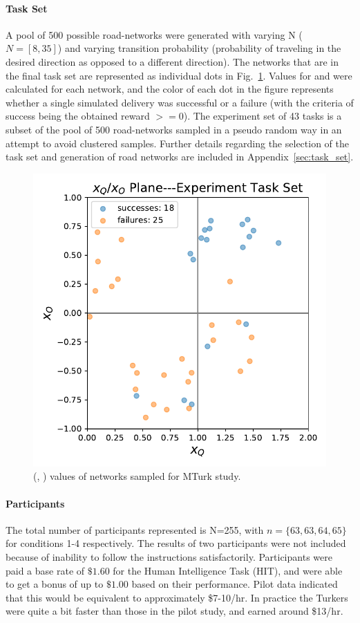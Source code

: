     \noindent \paragraph{Task Set}
    A pool of 500 possible road-networks were generated with varying N ($N=[8,35]$) and varying transition probability (probability of traveling in the desired direction as opposed to a different direction). The networks that are in the final task set are represented as individual dots in Fig.~\ref{fig:exp_set}. Values for \xQ{} and \xO{} were calculated for each network, and the color of each dot in the figure represents whether a single simulated delivery was successful or a failure (with the criteria of success being the obtained reward $ >= 0$). The experiment set of 43 tasks is a subset of the pool of 500 road-networks sampled in a pseudo random way in an attempt to avoid clustered samples. Further details regarding the selection of the task set and generation of road networks are included in Appendix~\ref{sec:task_set}.

    \begin{figure}[tbp]
        \centering
        \includegraphics[width=0.6\linewidth]{Figures/xQxO_plane_experiment_set.pdf}
        \caption{(\xQ{}, \xO{}) values of networks sampled for MTurk study.}
        \label{fig:exp_set}
    \end{figure}

    \noindent \paragraph{Participants}
    The total number of participants represented is N=255, with $n=\{63,63,64,65\}$ for conditions 1-4 respectively. The results of two participants were not included because of inability to follow the instructions satisfactorily. Participants were paid a base rate of $\$1.60$ for the Human Intelligence Task (HIT), and were able to get a bonus of up to $\$1.00$ based on their performance. Pilot data indicated that this would be equivalent to approximately \$7-10/hr. In practice the Turkers were quite a bit faster than those in the pilot study, and earned around \$13/hr.
